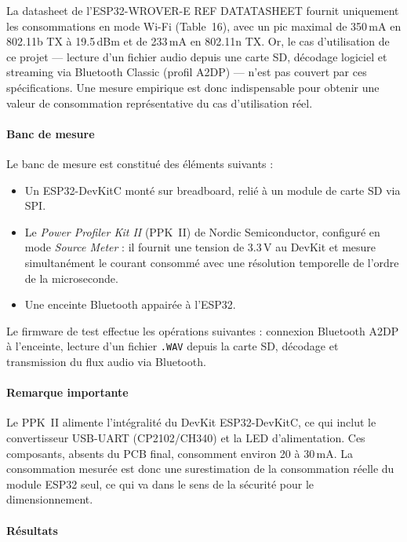 La datasheet de l'ESP32-WROVER-E REF DATATASHEET fournit uniquement les consommations en mode Wi-Fi (Table~16), avec un pic maximal de 350\,mA en 802.11b TX à 19.5\,dBm et de 233\,mA en 802.11n TX. Or, le cas d'utilisation de ce projet --- lecture d'un fichier audio depuis une carte SD, décodage logiciel et streaming via Bluetooth Classic (profil A2DP) --- n'est pas couvert par ces spécifications. Une mesure empirique est donc indispensable pour obtenir une valeur de consommation représentative du cas d'utilisation réel.

\paragraph{Banc de mesure}

Le banc de mesure est constitué des éléments suivants :

\begin{itemize}
    \item Un ESP32-DevKitC monté sur breadboard, relié à un module de carte SD via SPI.
    \item Le \textit{Power Profiler Kit II} (PPK~II) de Nordic Semiconductor, configuré en mode \textit{Source Meter} : il fournit une tension de 3.3\,V au DevKit et mesure simultanément le courant consommé avec une résolution temporelle de l'ordre de la microseconde.
    \item Une enceinte Bluetooth appairée à l'ESP32.
\end{itemize}

Le firmware de test effectue les opérations suivantes : connexion Bluetooth A2DP à l'enceinte, lecture d'un fichier \texttt{.WAV} depuis la carte SD, décodage et transmission du flux audio via Bluetooth.

\paragraph{Remarque importante} Le PPK~II alimente l'intégralité du DevKit ESP32-DevKitC, ce qui inclut le convertisseur USB-UART (CP2102/CH340) et la LED d'alimentation. Ces composants, absents du PCB final, consomment environ 20 à 30\,mA. La consommation mesurée est donc une surestimation de la consommation réelle du module ESP32 seul, ce qui va dans le sens de la sécurité pour le dimensionnement.

\paragraph{Résultats}


